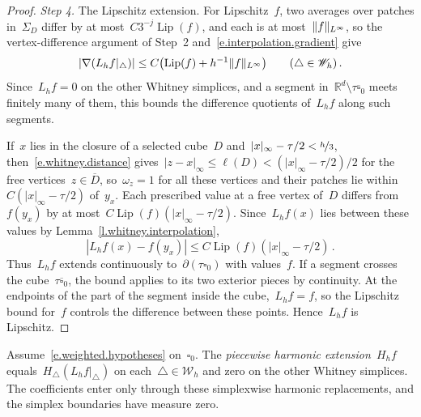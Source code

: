 \documentclass[11pt,letterpaper]{article}
\numberwithin{equation}{section}
\theoremstyle{definition}
\newcommand{\Rd}{\mathbb{R}^d}
\newcommand{\nf}{\nicefrac}
\newcommand{\cu}{\square}
\DeclarePairedDelimiter{\norm}{\lVert}{\rVert}
\begin{document}
\begin{proof}
\smallskip

\emph{Step 4.} The Lipschitz extension. For Lipschitz~$f$, two averages over patches in~$\Sigma_D$ differ by at most~$C3^{-j}\operatorname{Lip}(f)$, and each is at most~$\norm{f}_{L^\infty}$, so the vertex-difference argument of Step~2 and~\eqref{e.interpolation.gradient} give
\begin{equation*}
	|\nabla(L_hf|_\triangle)|\leq C\bigl(\operatorname{Lip}(f)+h^{-1}\norm{f}_{L^\infty}\bigr)\qquad(\triangle\in\mathscr W_h)\,.
\end{equation*}
Since~$L_hf=0$ on the other Whitney simplices, and a segment in~$\Rd\setminus\tau\overline{\cu}_0$ meets finitely many of them, this bounds the difference quotients of~$L_hf$ along such segments.

If~$x$ lies in the closure of a selected cube~$D$ and~$|x|_\infty-\tau/2<\nf h3$, then~\eqref{e.whitney.distance} gives~$|z-x|_\infty\leq\ell(D)<(|x|_\infty-\tau/2)/2$ for the free vertices~$z\in\overline D$, so~$\omega_z=1$ for all these vertices and their patches lie within~$C(|x|_\infty-\tau/2)$ of~$y_x$. Each prescribed value at a free vertex of~$D$ differs from~$f(y_x)$ by at most~$C\operatorname{Lip}(f)(|x|_\infty-\tau/2)$. Since~$L_hf(x)$ lies between these values by Lemma~\ref{l.whitney.interpolation},
\begin{equation*}
	|L_hf(x)-f(y_x)|\leq C\operatorname{Lip}(f)(|x|_\infty-\tau/2)\,.
\end{equation*}
Thus~$L_hf$ extends continuously to~$\partial(\tau\cu_0)$ with values~$f$. If a segment crosses the cube~$\tau\overline{\cu}_0$, the bound applies to its two exterior pieces by continuity. At the endpoints of the part of the segment inside the cube,~$L_hf=f$, so the Lipschitz bound for~$f$ controls the difference between these points. Hence~$L_hf$ is Lipschitz.
\end{proof}

Assume~\eqref{e.weighted.hypotheses} on~$\cu_0$. The \emph{piecewise harmonic extension}~$H_hf$ equals~$H_\triangle(L_hf|_\triangle)$ on each~$\triangle\in\mathscr W_h$ and zero on the other Whitney simplices. The coefficients enter only through these simplexwise harmonic replacements, and the simplex boundaries have measure zero.
\end{document}

